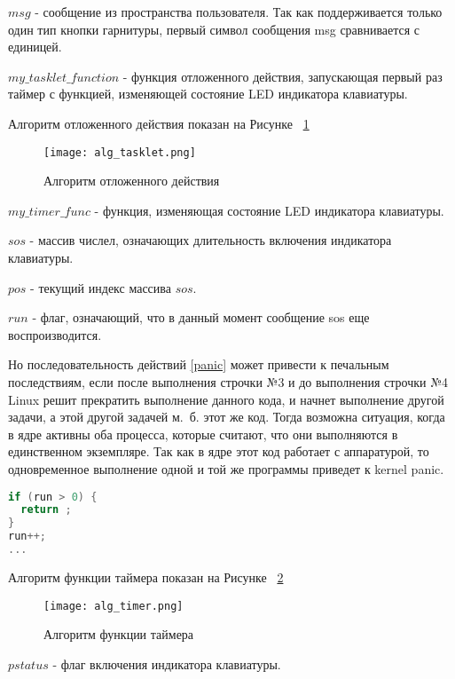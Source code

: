 $msg$ - сообщение из пространства пользователя. Так как поддерживается только один тип кнопки гарнитуры, первый символ сообщения msg сравнивается с единицей.

$my\_tasklet\_function$ - функция отложенного действия, запускающая первый раз таймер с функцией, изменяющей состояние LED индикатора клавиатуры.

Алгоритм отложенного действия показан на Рисунке ~\ref{image:alg_tasklet}

\begin{figure}[h]
  \centering
  \texttt{[image: alg\_tasklet.png]}
  \caption{Алгоритм отложенного действия}
  \label{image:alg_tasklet}
\end{figure}

$my\_timer\_func$ - функция, изменяющая состояние LED индикатора клавиатуры.

$sos$ - массив числел, означающих длительность включения индикатора клавиатуры.

$pos$ - текущий индекс массива $sos$.

$run$ - флаг, означающий, что в данный момент сообщение sos еще воспроизводится.

Но последовательность действий \ref{panic} может привести к печальным последствиям, если после выполнения строчки №3 и до выполнения строчки №4 Linux решит прекратить выполнение данного кода, и начнет выполнение другой задачи, а этой другой задачей м.~б. этот же код. Тогда возможна ситуация, когда в ядре активны оба процесса, которые считают, что они выполняются в единственном экземпляре. Так как в ядре этот код работает с аппаратурой, то одновременное выполнение одной и той же программы приведет к kernel panic. 

\begin{lstlisting}[language=C,caption={Опасный код},label=panic]
if (run > 0) {
  return ;
}
run++;
...
\end{lstlisting}

Алгоритм функции таймера показан на Рисунке ~\ref{image:alg_timer}

\begin{figure}[h]
  \centering
  \texttt{[image: alg\_timer.png]}
  \caption{Алгоритм функции таймера}
  \label{image:alg_timer}
\end{figure}

$pstatus$ - флаг включения индикатора клавиатуры.



